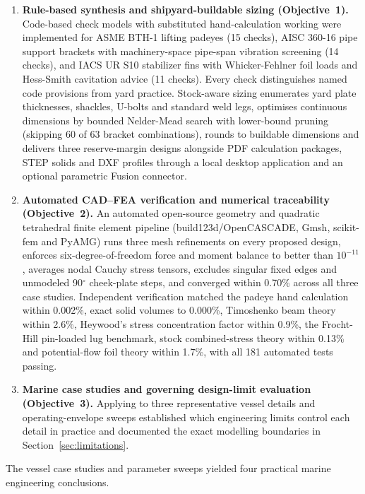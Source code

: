 \begin{enumerate}
    \item \textbf{Rule-based synthesis and shipyard-buildable sizing
    (Objective~1).} Code-based check models with substituted hand-calculation
    working were implemented for ASME BTH-1 lifting padeyes (15 checks), AISC
    360-16 pipe support brackets with machinery-space pipe-span vibration
    screening (14 checks), and IACS UR S10 stabilizer fins with Whicker-Fehlner
    foil loads and Hess-Smith cavitation advice (11 checks). Every check
    distinguishes named code provisions from yard practice. Stock-aware sizing
    enumerates yard plate thicknesses, shackles, U-bolts and standard weld
    legs, optimises continuous dimensions by bounded Nelder-Mead search with
    lower-bound pruning (skipping 60 of 63 bracket combinations), rounds to
    buildable dimensions and delivers three reserve-margin designs alongside
    PDF calculation packages, STEP solids and DXF profiles through a local
    desktop application and an optional parametric Fusion connector.
    \item \textbf{Automated CAD--FEA verification and numerical traceability
    (Objective~2).} An automated open-source geometry and quadratic tetrahedral
    finite element pipeline (build123d/OpenCASCADE, Gmsh, scikit-fem and
    PyAMG) runs three mesh refinements on every proposed design, enforces
    six-degree-of-freedom force and moment balance to better than $10^{-11}$,
    averages nodal Cauchy stress tensors, excludes singular fixed edges and
    unmodeled 90$^\circ$ cheek-plate steps, and converged within 0.70\% across
    all three case studies. Independent verification matched the padeye hand
    calculation within 0.002\%, exact solid volumes to 0.000\%, Timoshenko beam
    theory within 2.6\%, Heywood's stress concentration factor within 0.9\%,
    the Frocht-Hill pin-loaded lug benchmark, stock combined-stress theory
    within 0.13\% and potential-flow foil theory within 1.7\%, with all 181
    automated tests passing.
    \item \textbf{Marine case studies and governing design-limit evaluation
    (Objective~3).} Applying \NEMO{} to three representative vessel details and
    operating-envelope sweeps established which engineering limits control each
    detail in practice and documented the exact modelling boundaries in
    Section~\ref{sec:limitations}.
\end{enumerate}

The vessel case studies and parameter sweeps yielded four practical marine
engineering conclusions.


